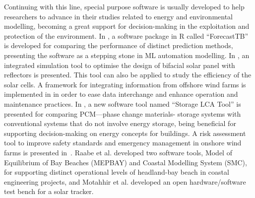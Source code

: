 \documentclass[energies,article,accept,moreauthors,pdftex]{Definitions/mdpi}
\begin{document}
		Continuing with this line, special purpose software is usually developed to help researchers to advance in their studies related to energy and environmental modelling, becoming a great support for decision-making in the exploitation and protection of the environment. In \cite{Neeraj2020}, a software package in R called ``ForecastTB'' is developed for comparing the performance of distinct prediction methods, presenting the software as a stepping stone in ML automation modelling.
		In \cite{LO2015293}, an integrated simulation tool to optimise the design of bifacial solar panel with reflectors is presented. This tool can also be applied to study the efficiency of the solar cells. A framework for integrating information from offshore wind farms is implemented in \cite{NGUYEN2013150} in order to ease data interchange and enhance operation and maintenance practices. 
		In \cite{Roberta2020}, a new software tool named ``Storage LCA Tool'' is presented for comparing PCM---phase change materials- storage systems with conventional systems that do not involve energy storage, being beneficial for supporting decision-making on energy concepts for buildings.
		A risk assessment tool to improve safety standards and emergency management in onshore wind farms is presented in~\cite{ASTIASOGARCIA201648}. Raabe et al. \cite{RAABE2010213} developed two software tools, Model of Equilibrium of Bay Beaches (MEPBAY) and Coastal Modelling System (SMC), for supporting distinct operational levels of headland-bay beach in coastal engineering projects, and Motahhir et al. \cite{MOTAHHIR20199} developed an open hardware/software test bench for a solar tracker.
		
\end{document}

